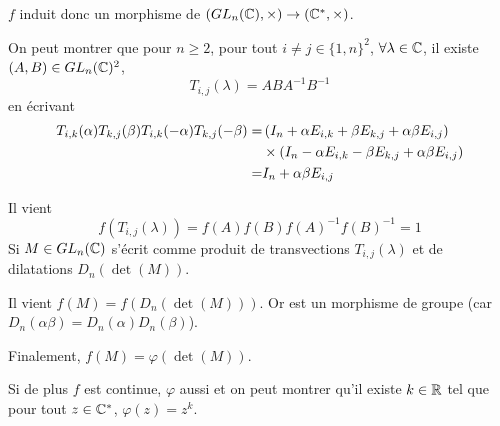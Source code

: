 \documentclass[12pt]{article}
\begin{document}
\begin{remark}
    $f$ induit donc un morphisme de $\left(GL_{n}(\mathbb{C}),\times\right)\to(\mathbb{C}^{*},\times)$.
\end{remark}

\begin{remark}
    On peut montrer que pour $n\geqslant 2$, pour tout $i\neq j\in\lbrace1,n\rbrace^{2}$, $\forall \lambda \in \mathbb{C}$, il existe $(A,B)\in GL_{n}(\mathbb{C})^{2}$,
    \begin{equation}
        T_{i,j}(\lambda)=ABA^{-1}B^{-1}
    \end{equation}
    en écrivant 
    \begin{align}
        T_{i,k}(\alpha)T_{k,j}(\beta)T_{i,k}(-\alpha)T_{k,j}(-\beta)
        =&\left(I_{n}+\alpha E_{i,k}+\beta E_{k,j}+\alpha \beta E_{i,j}\right)\notag\\
        ~~~~~~&\times \left(I_{n}-\alpha E_{i,k}-\beta E_{k,j}+\alpha\beta E_{i,j}\right)\\
        =&I_{n}+\alpha\beta E_{i,j}
    \end{align}

    Il vient 
    \begin{equation}
        f(T_{i,j}(\lambda))=f(A)f(B)f(A)^{-1}f(B)^{-1}=1
    \end{equation}
    Si $M\in GL_{n}(\mathbb{C})$ s'écrit comme produit de transvections $T_{i,j}(\lambda)$ et de dilatations $D_{n}(\det(M))$.

    Il vient $f(M)=f(D_{n}(\det(M)))$. Or 
    est un morphisme de groupe (car $D_{n}(\alpha\beta)=D_{n}(\alpha)D_{n}(\beta)$).

    Finalement, $f(M)=\varphi(\det(M))$.

    Si de plus $f$ est continue, $\varphi$ aussi et on peut montrer qu'il existe $k\in\mathbb{R}$ tel que pour tout $z\in\mathbb{C}^{*}$, $\varphi(z)=z^{k}$.
\end{remark}
\end{document}
